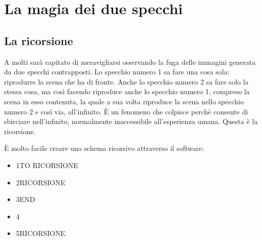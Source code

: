 \chapter{La magia dei due specchi} \label{cap:magia-specchi}

\section{La ricorsione}

A molti sarà capitato di meravigliarsi osservando la fuga delle immagini generata da due specchi contrapposti. Lo specchio numero 1 sa fare una cosa sola: riprodurre la scena che ha di fronte. Anche lo specchio numero 2 sa fare solo la stessa cosa, ma così facendo riproduce anche lo specchio numero 1, compreso la scena in esso contenuta, la quale a sua volta riproduce la scena nello specchio numero 2 e così via, all'infinito. È un fenomeno che colpisce perchè consente di sbirciare nell'infinito, normalmente inaccessibile all'esperienza umana. Questa è la ricorsione.

È molto facile creare uno schema ricorsivo attraverso il software:

\vskip 1cm

\begin{table}[H]
\begin{minipage}{1.0\textwidth}
\begin{itemize}[itemsep=-3pt,parsep=2pt]
\item[] \hspace{0.5cm}  1\hspace{8pt}TO RICORSIONE 
\item[] \hspace{0.5cm}  2\hspace{8pt}\hspace{8pt}RICORSIONE
\item[] \hspace{0.5cm}	3\hspace{8pt}END
\item[] \hspace{0.5cm}  4\hspace{8pt}
\item[] \hspace{0.5cm}  5\hspace{8pt}RICORSIONE   
\end{itemize}          	          
\end{minipage}
\end{table}

\vskip 1cm

